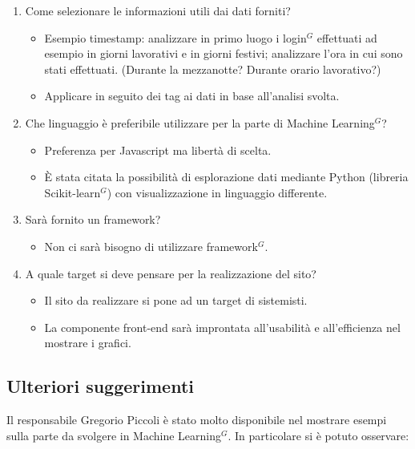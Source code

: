 \begin{enumerate}
	\item Come selezionare le informazioni utili dai dati forniti?
	\begin{itemize}
		\item Esempio timestamp: analizzare in primo luogo i login$^{G}$ effettuati ad esempio in giorni lavorativi e in giorni festivi; analizzare l'ora in cui sono stati effettuati. (Durante la mezzanotte? Durante orario lavorativo?)
		\item Applicare in seguito dei tag ai dati in base all'analisi svolta.
	\end{itemize}

	\item Che linguaggio è preferibile utilizzare per la parte di Machine Learning$^{G}$?
	\begin{itemize}
		\item Preferenza per Javascript ma libertà di scelta.
		\item \`E stata citata la possibilità di esplorazione dati mediante Python (libreria Scikit-learn$^{G}$) con visualizzazione in linguaggio differente.
	\end{itemize}

	\item Sarà fornito un framework?
	\begin{itemize}
		\item Non ci sarà bisogno di utilizzare framework$^{G}$.
	\end{itemize}

	\item A quale target si deve pensare per la realizzazione del sito?
	\begin{itemize}
		\item Il sito da realizzare si pone ad un target di sistemisti.
		\item La componente front-end sarà improntata all'usabilità e all'efficienza nel mostrare i grafici.
	\end{itemize}

\end{enumerate}

\subsection{Ulteriori suggerimenti}

Il responsabile Gregorio Piccoli è stato molto disponibile nel mostrare esempi sulla parte da svolgere in Machine Learning$^{G}$. In particolare si è potuto osservare:

